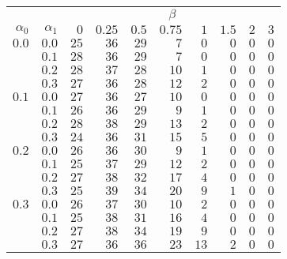 \begin{tabular}{rr|rrrrrrrr}
\hline\hline
 && \multicolumn{8}{c}{$\beta$}\\
 $\alpha_0$ & $\alpha_1$ & $0$ & $0.25$ & $0.5$ & $0.75$ & $1$ & $1.5$ & $2$ & $3$ \\ 
 \hline
$0.0$ & $0.0$ & $25$ & $36$ & $29$ & $7$ & $0$ & $0$ & $0$ & $0$\\ 
 & $0.1$ & $28$ & $36$ & $29$ & $7$ & $0$ & $0$ & $0$ & $0$\\ 
 & $0.2$ & $28$ & $37$ & $28$ & $10$ & $1$ & $0$ & $0$ & $0$\\ 
 & $0.3$ & $27$ & $36$ & $28$ & $12$ & $2$ & $0$ & $0$ & $0$\\ 
\hline 
 $0.1$ & $0.0$ & $27$ & $36$ & $27$ & $10$ & $0$ & $0$ & $0$ & $0$\\ 
 & $0.1$ & $26$ & $36$ & $29$ & $9$ & $1$ & $0$ & $0$ & $0$\\ 
 & $0.2$ & $28$ & $38$ & $29$ & $13$ & $2$ & $0$ & $0$ & $0$\\ 
 & $0.3$ & $24$ & $36$ & $31$ & $15$ & $5$ & $0$ & $0$ & $0$\\ 
\hline 
 $0.2$ & $0.0$ & $26$ & $36$ & $30$ & $9$ & $1$ & $0$ & $0$ & $0$\\ 
 & $0.1$ & $25$ & $37$ & $29$ & $12$ & $2$ & $0$ & $0$ & $0$\\ 
 & $0.2$ & $27$ & $38$ & $32$ & $17$ & $4$ & $0$ & $0$ & $0$\\ 
 & $0.3$ & $25$ & $39$ & $34$ & $20$ & $9$ & $1$ & $0$ & $0$\\ 
\hline 
 $0.3$ & $0.0$ & $26$ & $37$ & $30$ & $10$ & $2$ & $0$ & $0$ & $0$\\ 
 & $0.1$ & $25$ & $38$ & $31$ & $16$ & $4$ & $0$ & $0$ & $0$\\ 
 & $0.2$ & $27$ & $38$ & $34$ & $19$ & $9$ & $0$ & $0$ & $0$\\ 
 & $0.3$ & $27$ & $36$ & $36$ & $23$ & $13$ & $2$ & $0$ & $0$\\ 
 \hline 
 \end{tabular}